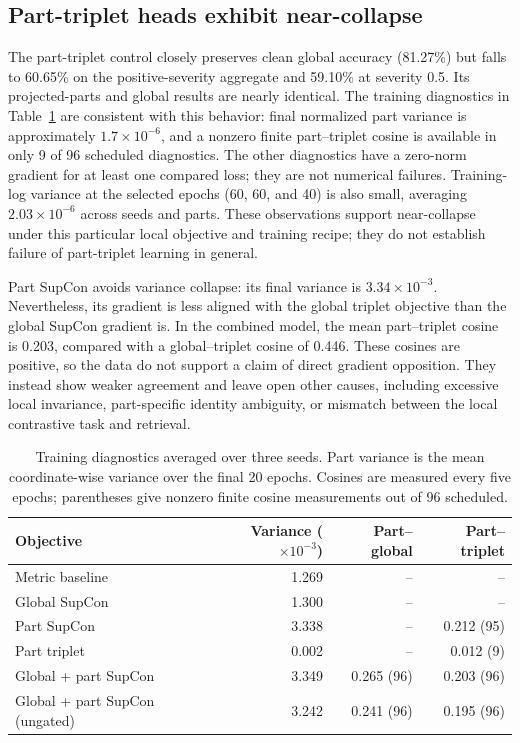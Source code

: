 \documentclass[pdflatex,iicol,sn-apa]{sn-jnl}
\begin{document}
\subsection{Part-triplet heads exhibit near-collapse}

The part-triplet control closely preserves clean global accuracy (81.27\%) but
falls to 60.65\% on the positive-severity aggregate and 59.10\% at severity 0.5.
Its projected-parts and global results are nearly identical. The training
diagnostics in Table~\ref{tab:mechanisms} are consistent with this behavior: final normalized
part variance is approximately $1.7\times10^{-6}$, and a nonzero finite
part--triplet cosine is available in only 9 of 96 scheduled diagnostics. The
other diagnostics have a zero-norm gradient for at least one compared loss;
they are not numerical failures. Training-log variance at the selected epochs (60, 60, and 40) is also
small, averaging $2.03\times10^{-6}$ across seeds and parts. These
observations support near-collapse under this particular local objective
and training recipe; they do not establish failure of part-triplet learning
in general.

Part SupCon avoids variance collapse: its final variance is
$3.34\times10^{-3}$. Nevertheless, its gradient is less aligned with the
global triplet objective than the global SupCon gradient is. In the combined
model, the mean part--triplet cosine is 0.203, compared with a global--triplet
cosine of 0.446. These cosines are positive, so the data do not support a claim
of direct gradient opposition. They instead show weaker agreement and leave
open other causes, including excessive local invariance, part-specific identity
ambiguity, or mismatch between the local contrastive task and retrieval.

\begin{table}[t]
\centering
\caption{Training diagnostics averaged over three seeds. Part variance is the
mean coordinate-wise variance over the final 20 epochs. Cosines are measured
every five epochs; parentheses give nonzero finite cosine measurements out of
96 scheduled.}
\label{tab:mechanisms}
\small
\setlength{\tabcolsep}{4pt}
\begin{tabular}{@{}lrrr@{}}
\toprule
Objective & Variance ($\times10^{-3}$) & Part--global & Part--triplet \\
\midrule
Metric baseline & 1.269 & -- & -- \\
Global SupCon & 1.300 & -- & -- \\
Part SupCon & 3.338 & -- & 0.212 (95) \\
Part triplet & 0.002 & -- & 0.012 (9) \\
Global + part SupCon & 3.349 & 0.265 (96) & 0.203 (96) \\
Global + part SupCon (ungated) & 3.242 & 0.241 (96) & 0.195 (96) \\
\bottomrule
\end{tabular}
\end{table}
\end{document}
